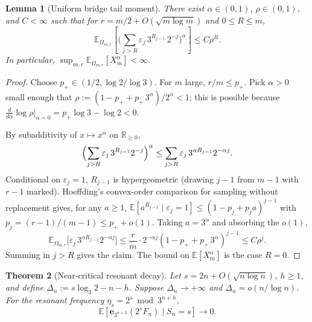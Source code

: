\documentclass[11pt,a4paper]{amsart}
\theoremstyle{plain}
\newtheorem{theorem}{Theorem}[section]
\newtheorem{lemma}[theorem]{Lemma}
\theoremstyle{definition}
\newcommand{\R}{\mathbb{R}}
\newcommand{\E}{\mathbb{E}}
\begin{document}
\begin{lemma}[Uniform bridge tail moment]
\label{lem:uniform-bridge-tail-moment}
There exist $\alpha\in(0,1)$, $\rho\in(0,1)$, and $C<\infty$ such that
for $r=m/2+O(\sqrt{m\log m})$ and $0\le R\le m$,
$$
\E_{\Omega_{m,r}}\!\left[\bigl(\textstyle\sum_{j>R}\varepsilon_j\,3^{R_{j-1}}\,2^{-j}\bigr)^\alpha\right]
\le C\rho^R.
$$
In particular, $\sup_{m,r}\E_{\Omega_{m,r}}[X_m^\alpha]<\infty$.
\end{lemma}

\begin{proof}
Choose $p_+\in(1/2,\log 2/\log 3)$.
For $m$ large, $r/m\le p_+$.
Pick $\alpha>0$ small enough that
$\rho:=(1-p_++p_+\,3^\alpha)/2^\alpha<1$;
this is possible because $\frac{d}{d\alpha}\log\rho|_{\alpha=0}=p_+\log 3-\log 2<0$.

By subadditivity of $x\mapsto x^\alpha$ on $\R_{\ge 0}$,
$$
\Bigl(\sum_{j>R}\varepsilon_j\,3^{R_{j-1}}2^{-j}\Bigr)^\alpha
\le\sum_{j>R}\varepsilon_j\,3^{\alpha R_{j-1}}2^{-\alpha j}.
$$
Conditional on $\varepsilon_j=1$, $R_{j-1}$ is hypergeometric (drawing
$j-1$ from $m-1$ with $r-1$ marked).
Hoeffding's convex-order comparison for sampling without replacement gives,
for any $a\ge 1$,
$\E[a^{R_{j-1}}\mid\varepsilon_j=1]\le(1-p_j+p_j a)^{j-1}$ with
$p_j=(r-1)/(m-1)\le p_+ +o(1)$.
Taking $a=3^\alpha$ and absorbing the $o(1)$,
$$
\E_{\Omega_{m,r}}\bigl[\varepsilon_j\,3^{\alpha R_{j-1}}2^{-\alpha j}\bigr]
\le\frac{r}{m}\cdot 2^{-\alpha j}(1-p_++p_+\,3^\alpha)^{j-1}\le C\rho^j.
$$
Summing in $j>R$ gives the claim.
The bound on $\E[X_m^\alpha]$ is the case $R=0$.
\end{proof}

\begin{theorem}[Near-critical resonant decay]\label{thm:M}
Let $s=2n+O(\sqrt{n\log n})$, $h\ge1$, and define
$\Delta_n:=s\log_3 2-n-h$.
Suppose $\Delta_n\to+\infty$ and $\Delta_n=o(n/\log n)$.
For the resonant frequency $\eta_s=2^s\bmod 3^{n+h}$,
$$
\E[\mathbf e_{3^{n+h}}(2^s F_n)\mid S_n=s]\to0.
$$
\end{theorem}
\end{document}

